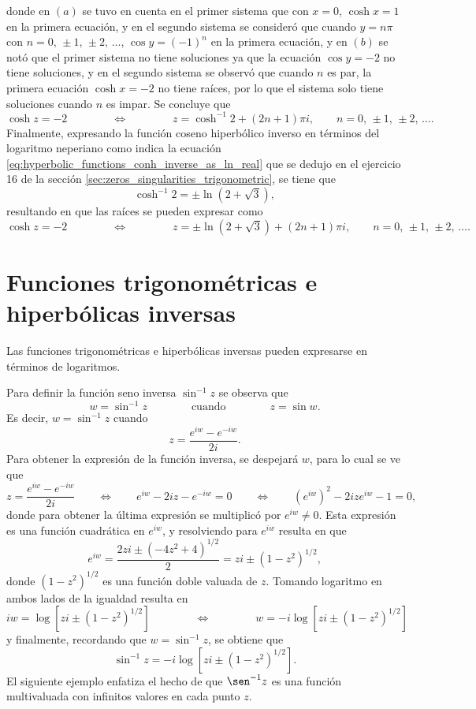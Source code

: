 \documentclass[a4paper]{report}
\begin{document}
donde en \((a)\) se tuvo en cuenta en el primer sistema que con \(x=0\), \(\cosh x=1\) en la primera ecuación, y en el segundo sistema se consideró que cuando \(y=n\pi\) con \(n=0,\,\pm1,\,\pm2,\,\dots\), \(\cos y=(-1)^n\) en la primera ecuación, y en \((b)\) se notó que el primer sistema no tiene soluciones ya que la ecuación \(\cos y=-2\) no tiene soluciones, y en el segundo sistema se observó que cuando \(n\) es par, la primera ecuación \(\cosh x=-2\) no tiene raíces, por lo que el sistema solo tiene soluciones cuando \(n\) es impar. Se concluye que 
\[
 \cosh z=-2
 \qquad\qquad\Leftrightarrow\qquad\qquad
 z=\cosh^{-1}2+(2n+1)\pi i,
 \qquad n=0,\,\pm1,\,\pm2,\,\dots. 
\]
Finalmente, expresando la función coseno hiperbólico inverso en términos del logaritmo neperiano como indica la ecuación \ref{eq:hyperbolic_functions_conh_inverse_as_ln_real} que se dedujo en el ejercicio 16 de la sección \ref{sec:zeros_singularities_trigonometric}, se tiene que 
\[
 \cosh^{-1}2=\pm\ln(2+\sqrt{3}),
\]
resultando en que las raíces se pueden expresar como 
\[
 \cosh z=-2
 \qquad\qquad\Leftrightarrow\qquad\qquad
 z=\pm\ln(2+\sqrt{3})+(2n+1)\pi i,
 \qquad n=0,\,\pm1,\,\pm2,\,\dots. 
\]

\section{Funciones trigonométricas e hiperbólicas inversas}

Las funciones trigonométricas e hiperbólicas inversas pueden expresarse en términos de logaritmos.

Para definir la función seno inversa \(\sin^{-1}z\) se observa que 
\[
 w=\sin^{-1}z
 \qquad\qquad\textrm{cuando}\qquad\qquad
 z=\sin w.
\]
Es decir, \(w=\sin^{-1}z\) cuando
\[
 z=\frac{e^{iw}-e^{-iw}}{2i}.
\]
Para obtener la expresión de la función inversa, se despejará \(w\), para lo cual se ve que 
\[
 z=\frac{e^{iw}-e^{-iw}}{2i}
 \qquad\Leftrightarrow\qquad
 e^{iw}-2iz-e^{-iw}=0
 \qquad\Leftrightarrow\qquad
 (e^{iw})^2-2ize^{iw}-1=0,
\]
donde para obtener la última expresión se multiplicó por \(e^{iw}\neq0\). Esta expresión es una función cuadrática en \(e^{iw}\), y resolviendo para \(e^{iw}\) resulta en que
\[
 e^{iw}=\frac{2zi\pm(-4z^2+4)^{1/2}}{2}=zi\pm(1-z^2)^{1/2},
\]
donde \((1-z^2)^{1/2}\) es una función doble valuada de \(z\). Tomando logaritmo en ambos lados de la igualdad resulta en
\[
 iw=\log\left[zi\pm(1-z^2)^{1/2}\right]
 \qquad\qquad\Leftrightarrow\qquad\qquad
 w=-i\log\left[zi\pm(1-z^2)^{1/2}\right]
\]
y finalmente, recordando que \(w=\sin^{-1}z\), se obtiene que
\begin{equation}\label{eq:inverse_trigonometric_sin_log}
 \sin^{-1}z=-i\log\left[zi\pm(1-z^2)^{1/2}\right]. 
\end{equation}
El siguiente ejemplo enfatiza el hecho de que \(\sen^{-1}z\) es una función multivaluada con infinitos valores en cada punto \(z\). 
\end{document}
